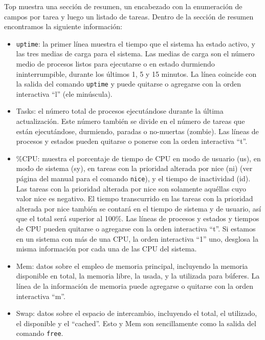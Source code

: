 \documentclass[12pt]{article}
\begin{document}
Top muestra una sección de resumen, un encabezado con la enumeración de
campos por tarea y luego un listado de tareas. Dentro de la sección de
resumen encontramos la siguiente información:  

\begin{itemize}
\item \texttt{uptime}: la primer línea muestra el tiempo
 que el sistema ha  estado  activo,  y  las  tres medias de carga para el 
sistema. Las medias de carga son  el número medio de procesos listos  para
ejecutarse  o en estado durmiendo ininterrumpible, durante  los  últimos
1,  5  y  15  minutos.  La línea coincide con la salida del comando 
\texttt{uptime} y puede quitarse o agregarse con la orden interactiva 
``l'' (ele minúscula).
\item  Tasks: el  número  total  de  procesos ejecutándose durante  la  
última actualización. Este número también  se  divide  en  el  número 
de  tareas  que  están  ejecutándose, durmiendo, paradas o no-muertas 
(zombie).  Las líneas de procesos y estados pueden quitarse o ponerse con 
la orden interactiva ``t''.
\item  \%CPU: muestra el porcentaje de tiempo de CPU en modo de usuario 
(us), en modo  de sistema (sy), en tareas con la prioridad alterada por
 nice (ni) (ver página del manual para el comando \texttt{nice}), y el 
 tiempo  de  inactividad (id).  Las tareas con la prioridad alterada por 
nice son solamente aquéllas cuyo  valor  nice  es  negativo. El tiempo  
transcurrido  en  las tareas con la prioridad alterada por nice también 
se contará en el tiempo de sistema y de usuario,  así que  el  total  
será  superior  al  100\%. Las líneas de procesos y estados y tiempos
 de CPU pueden quitarse o agregarse  con  la  orden interactiva ``t''.
Si estamos en un sistema con más de una CPU, la orden interactiva ``1'' 
uno, desglosa la misma información por cada una de las CPU del sistema.
\item Mem: datos sobre el empleo de memoria principal, incluyendo la 
memoria disponible en total,  la  memoria  libre,  la  usada, y  la
utilizada  para  búferes.  La  línea  de la información de memoria puede 
agregarse o quitarse con la orden interactiva ``m''.
\item Swap: datos sobre el  espacio  de  intercambio,  incluyendo  el  
total,  el utilizado, el disponible  y  el ``cached''. Esto y Mem son 
sencillamente como la salida del comando \texttt{free}.
\end{itemize}
\end{document}

